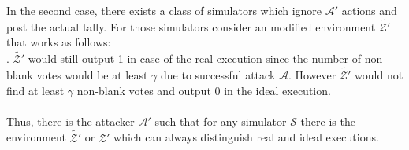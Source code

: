 \documentclass[12pt]{article}
\begin{document}
In the second case, there exists a class of simulators which ignore $\mathcal{A'}$ actions and post the actual tally.  For those simulators consider an modified  environment $\tilde{\mathcal{Z'}}$ that works as follows:\\
.
$\tilde{\mathcal{Z'}}$ would still output 1 in case of the real execution since the number of non-blank votes would be at least $\gamma$ due to successful attack  $\mathcal{A}$. However  $\tilde{\mathcal{Z'}}$ would not find at least $\gamma$ non-blank votes and output 0 in the ideal execution. \\\\
Thus, there is the attacker $\mathcal{A'}$ such that for any simulator $\mathcal{S}$ there is the environment $\tilde{\mathcal{Z'}}$ or $\mathcal{Z'}$ which can always distinguish real and ideal executions. \\\\
\end{document}
